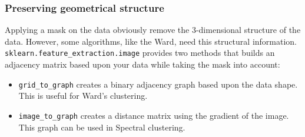 \documentclass{frontiersSCNS} %
\newcommand{\alex}[1]{\todo[inline, color=green!40]{#1}}
\begin{document}




\subsubsection{Preserving geometrical structure}

Applying a mask on the data obviously remove the 3-dimensional structure of the
data. However, some algorithms, like the Ward, need this structural information.
\verb!sklearn.feature_extraction.image! provides two methods that builds an
adjacency matrix based upon your data while taking the mask into account:
\begin{itemize}
    \item \verb!grid_to_graph! creates a binary adjacency graph based upon the
        data shape. This is useful for Ward's clustering.
    \item \verb!image_to_graph! creates a distance matrix using the gradient of
        the image. This graph can be used in Spectral clustering.
\end{itemize}



\end{document}
